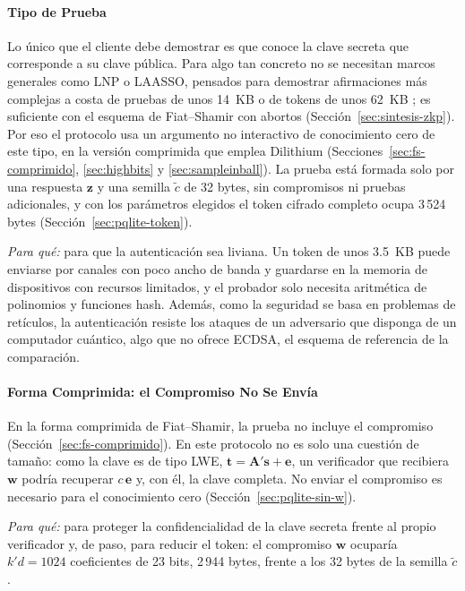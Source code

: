 \paragraph{Tipo de Prueba}
Lo único que el cliente debe demostrar es que conoce la clave secreta que corresponde a su clave pública. Para algo tan concreto no se necesitan marcos generales como LNP o LAASSO, pensados para demostrar afirmaciones más complejas a costa de pruebas de unos 14~KB o de tokens de unos 62~KB \cite{lyubashevsky2022lattice, ma2026laasso}; es suficiente con el esquema de Fiat--Shamir con abortos (Sección~\ref{sec:sintesis-zkp}). Por eso el protocolo usa un argumento no interactivo de conocimiento cero de este tipo, en la versión comprimida que emplea Dilithium (Secciones~\ref{sec:fs-comprimido}, \ref{sec:highbits} y \ref{sec:sampleinball}). La prueba está formada solo por una respuesta $\mathbf{z}$ y una semilla $\tilde{c}$ de 32 bytes, sin compromisos ni pruebas adicionales, y con los parámetros elegidos el token cifrado completo ocupa 3\,524 bytes (Sección~\ref{sec:pqlite-token}).

\textit{Para qué:} para que la autenticación sea liviana. Un token de unos 3.5~KB puede enviarse por canales con poco ancho de banda y guardarse en la memoria de dispositivos con recursos limitados, y el probador solo necesita aritmética de polinomios y funciones hash. Además, como la seguridad se basa en problemas de retículos, la autenticación resiste los ataques de un adversario que disponga de un computador cuántico, algo que no ofrece ECDSA, el esquema de referencia de la comparación.

\paragraph{Forma Comprimida: el Compromiso No Se Envía}
En la forma comprimida de Fiat--Shamir, la prueba no incluye el compromiso (Sección~\ref{sec:fs-comprimido}). En este protocolo no es solo una cuestión de tamaño: como la clave es de tipo LWE, $\mathbf{t} = \mathbf{A}'\mathbf{s} + \mathbf{e}$, un verificador que recibiera $\mathbf{w}$ podría recuperar $c\,\mathbf{e}$ y, con él, la clave completa. No enviar el compromiso es necesario para el conocimiento cero (Sección~\ref{sec:pqlite-sin-w}).

\textit{Para qué:} para proteger la confidencialidad de la clave secreta frente al propio verificador y, de paso, para reducir el token: el compromiso $\mathbf{w}$ ocuparía $k'd = 1024$ coeficientes de 23 bits, 2\,944 bytes, frente a los 32 bytes de la semilla $\tilde{c}$.

